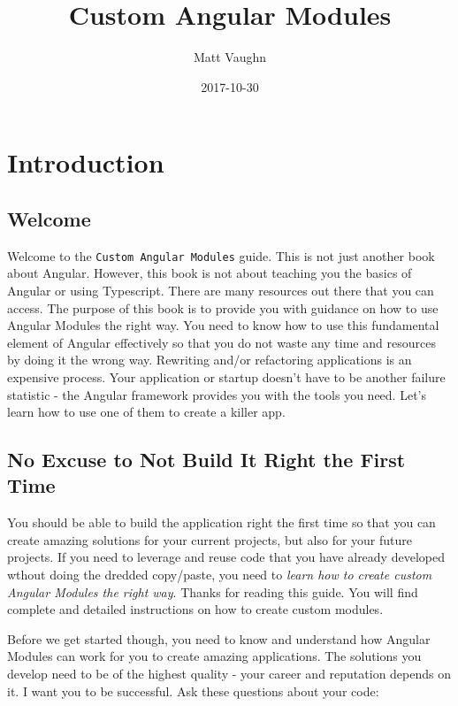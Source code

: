 \documentclass[]{book}
\title{Custom Angular Modules}
\author{Matt Vaughn}
\date{2017-10-30}
\theoremstyle{definition}
\theoremstyle{definition}
\theoremstyle{definition}
\theoremstyle{remark}
\begin{document}
\maketitle

{
\setcounter{tocdepth}{1}
\tableofcontents
}
\chapter{Introduction}\label{intro}

\section{Welcome}\label{welcome}

Welcome to the \texttt{Custom\ Angular\ Modules} guide. This is not just
another book about Angular. However, this book is not about teaching you
the basics of Angular or using Typescript. There are many resources out
there that you can access. The purpose of this book is to provide you
with guidance on how to use Angular Modules the right way. You need to
know how to use this fundamental element of Angular effectively so that
you do not waste any time and resources by doing it the wrong way.
Rewriting and/or refactoring applications is an expensive process. Your
application or startup doesn't have to be another failure statistic -
the Angular framework provides you with the tools you need. Let's learn
how to use one of them to create a killer app.

\section{No Excuse to Not Build It Right the First
Time}\label{no-excuse-to-not-build-it-right-the-first-time}

You should be able to build the application right the first time so that
you can create amazing solutions for your current projects, but also for
your future projects. If you need to leverage and reuse code that you
have already developed wthout doing the dredded copy/paste, you need to
\emph{learn how to create custom Angular Modules the right way}. Thanks
for reading this guide. You will find complete and detailed instructions
on how to create custom modules.

Before we get started though, you need to know and understand how
Angular Modules can work for you to create amazing applications. The
solutions you develop need to be of the highest quality - your career
and reputation depends on it. I want you to be successful. Ask these
questions about your code:
\end{document}
